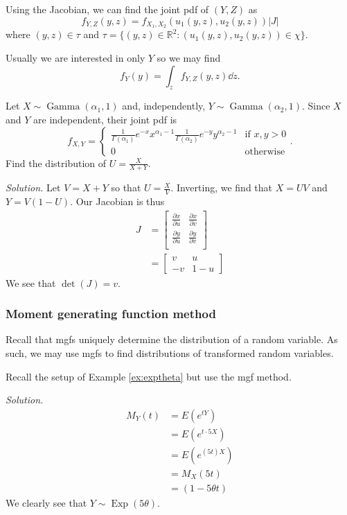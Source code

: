 Using the Jacobian, we can find the joint pdf of $(Y,Z)$ as
$$f_{Y,Z}(y,z)=f_{X_1,X_2}(u_1(y,z),u_2(y,z))|J|$$
where $(y,z)\in\tau$ and $\tau=\{(y,z)\in\mathbb R^2:(u_1(y,z),u_2(y,z))\in\chi\}$.

Usually we are interested in only $Y$ so we may find
$$f_Y(y)=\int_zf_{Y,Z}(y,z)\dd z.$$

\begin{example}[]
	Let $X\sim\operatorname{Gamma}(\alpha_1,1)$ and, independently, $Y\sim\operatorname{Gamma}(\alpha_2,1)$. Since $X$ and $Y$ are independent, their joint pdf is
	$$f_{X,Y}=\begin{cases}
		\frac{1}{\Gamma(\alpha_1)}e^{-x}x^{\alpha_1-1}\frac{1}{\Gamma(\alpha_2)}e^{-y}y^{\alpha_2-1} & \text{if $x,y>0$}\\
		0 & \text{otherwise}
	\end{cases}.$$
	Find the distribution of $U=\frac{X}{X+Y}$.

	\textit{Solution.} Let $V=X+Y$ so that $U=\frac{X}{V}$. Inverting, we find that $X=UV$ and $Y=V(1-U)$. Our Jacobian is thus
	\begin{align*}
		J&=\begin{bmatrix}
			\frac{\partial x}{\partial u} & \frac{\partial x}{\partial v}\\
			\frac{\partial y}{\partial u} & \frac{\partial y}{\partial v}\\
		\end{bmatrix}\\
		&=\begin{bmatrix}
			v & u\\
			-v & 1-u
		\end{bmatrix}
	\end{align*}
	We see that $\det(J)=v$. 
\end{example}

\subsubsection*{Moment generating function method}

Recall that mgfs uniquely determine the distribution of a random variable. As such, we may use mgfs to find distributions of transformed random variables.

\begin{example}[]
	Recall the setup of Example \ref{ex:exptheta} but use the mgf method.

	\textit{Solution.}
	\begin{align*}
		M_Y(t)&=E(e^{tY})\\
		&=E(e^{t\cdot 5X})\\
		&=E(e^{(5t)X})\\
		&=M_X(5t)\\
		&=(1-5\theta t)
	\end{align*}
	We clearly see that $Y\sim\operatorname{Exp}(5\theta)$.
\end{example}


